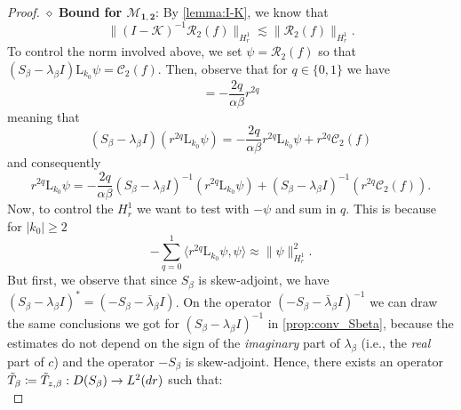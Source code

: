 \documentclass[10pt,a4paper]{amsart}
\def\HH {\dot{H}^1}
\def\dd{{\rm d}}
\newcommand{\cK}{\mathcal{K}}
\newcommand{\cM}{\mathcal{M}}
\newcommand{\cR}{\mathcal{R}}
\newcommand{\rmL}{\mathrm{L}}
\begin{document}
\begin{proof}

\medskip

\noindent $\diamond$ \textbf{Bound for $\mathbf{\cM_{1,2}}$}: By \cref{lemma:I-K}, we know that 
\begin{equation}
    \|(I-\cK)^{-1}\cR_2(f)\|_{H^1_r}\lesssim \| \cR_2(f)\|_{H^1_r}.
\end{equation}
To control the norm involved above, we set $\psi = \mathcal R_2(f)$ so that $(S_\beta-\lambda_\beta I)\rmL_{k_0} \psi = 
\mathcal{C}_2(f)$. Then, observe that for $q\in \{0,1\}$ we have 
\begin{equation}
    [S_\beta-\lambda_\beta I,r^{2q}]=-\frac{2q}{\alpha \beta}r^{2q}
\end{equation}
meaning that
\begin{equation}
    (S_\beta-\lambda_\beta I)(r^{2q}\rmL_{k_0} \psi )= -\frac{2q}{\alpha \beta}r^{2q}\rmL_{k_0}\psi+r^{2q}
\mathcal{C}_2(f)
\end{equation}
and consequently
\begin{equation}
\label{eq:rqpsi}
   r^{2q}\rmL_{k_0} \psi=-\frac{2q}{\alpha\beta}(S_\beta-\lambda_\beta I)^{-1}(r^{2q}\rmL_{k_0}\psi) +(S_\beta-\lambda_\beta I)^{-1}(r^{2q}\mathcal{C}_2(f)).
\end{equation}
Now, to control the $H^1_r$ we want to test with $-\psi$ and sum in $q$. This is because for $|k_0|\geq 2$
\begin{equation}
- \sum_{q=0}^1\langle r^{2q}\rmL_{k_0} \psi,\psi\rangle \approx \|\psi\|_{H^1_r}^2.
\end{equation}
But first, we observe that 
since $S_\beta$ is skew-adjoint, we have  $(S_\beta-\lambda_\beta I)^* = (-S_\beta -\bar{\lambda}_\beta I)$. On the operator $(-S_\beta - \bar{\lambda}_\beta I)^{-1}$ we can draw the same conclusions we got for $(S_\beta - \lambda_\beta I)^{-1}$ in \cref{prop:conv_Sbeta}, because the estimates do not depend on the sign of the \textit{imaginary} part of $\lambda_\beta$ (i.e., the \textit{real} part of $c$) and the operator $-S_\beta$ is skew-adjoint. Hence, there exists an operator $\tilde T_{\beta}\coloneqq \tilde T_{z,\beta} :D(S_\beta) \to L^2(\dd r)$ such that:
\begin{equation}

\end{equation}
\end{proof}
\end{document}
